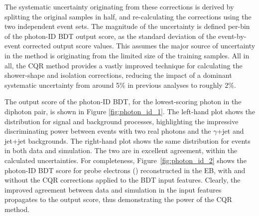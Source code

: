 The systematic uncertainty originating from these corrections is derived by splitting the original \Zee samples in half, and re-calculating the corrections using the two independent event sets. The magnitude of the uncertainty is defined per-bin of the photon-ID BDT output score, as the standard deviation of the event-by-event corrected output score values. This assumes the major source of uncertainty in the method is originating from the limited size of the training samples. All in all, the CQR method provides a vastly improved technique for calculating the shower-shape and isolation corrections, reducing the impact of a dominant systematic uncertainty from around 5\% in previous \Hgg analyses to roughly 2\%.

The output score of the photon-ID BDT, for the lowest-scoring photon in the diphoton pair, is shown in Figure \ref{fig:photon_id_1}. The left-hand plot shows the distribution for signal and background processes, highlighting the impressive discriminating power between events with two real photons and the $\gamma$+jet and jet+jet backgrounds. The right-hand plot shows the same distribution for \Zee events in both data and simulation. The two are in excellent agreement, within the calculated uncertainties. For completeness, Figure~\ref{fig:photon_id_2} shows the photon-ID BDT score for probe electrons (\Zee) reconstructed in the EB, with and without the CQR corrections applied to the BDT input features. Clearly, the improved agreement between data and simulation in the input features propagates to the output score, thus demonstrating the power of the CQR method.

